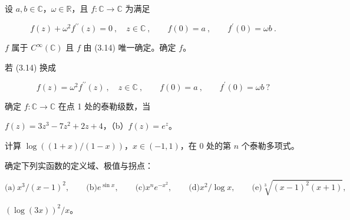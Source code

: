\begin{exercises}
\item[2.]

设 $ a, b \in \mathbb{C} $，$ \omega \in \mathbb{R} $，且 $ f : \mathbb{C} \to \mathbb{C} $ 为满足

\begin{equation}
f(z)+\omega^{2}f^{\prime\prime}(z)=0~,\quad z\in\mathbb{C}~,\qquad f(0)=a~,\qquad f^{\prime}(0)=\omega b~.
\end{equation}

\begin{items}
\item

\proofhead
$f$ 属于 $C^{\infty}(\mathbb{C})$ 且 $f$ 由 (3.14) 唯一确定。确定 $f$。
\item

若 (3.14) 换成

\[
f(z)=\omega^{2}f^{\prime\prime}(z)~,\quad z\in\mathbb{C}~,\qquad f(0)=a~,\qquad f^{\prime}(0)=\omega b~?
\]
\end{items}

\item[3.]

确定 $ f: \mathbb{C} \to \mathbb{C} $ 在点 1 处的泰勒级数，当

\begin{items}
\item

$ f(z) = 3z^{3} - 7z^{2} + 2z + 4 $，（b）$ f(z) = e^{z} $。

\end{items}

\item[4.]

计算 $ \log\left((1+x)/(1-x)\right) $，$ x \in (-1,1) $，在 0 处的第 $ n $ 个泰勒多项式。

\item[5.]

确定下列实函数的定义域、极值与拐点：

\[
\text{(a)}\ x^{3}/(x-1)^{2},\qquad\text{(b)}e^{\sin x},\qquad\text{(c)}x^{n}e^{-x^{2}},\qquad\text{(d)}x^{2}/\log x,\qquad\text{(e)}\sqrt[3]{(x-1)^{2}(x+1)},
\]

\begin{items}
\item[（f）]

$ (\log(3x))^2 / x $。

\end{items}

\item[6.]


\end{exercises}
